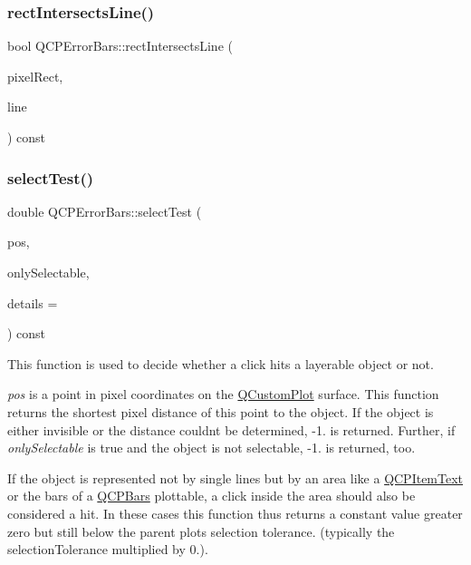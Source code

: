 \subsubsection{\texorpdfstring{rectIntersectsLine()}{rectIntersectsLine()}}
{\footnotesize\ttfamily bool Q\+C\+P\+Error\+Bars\+::rect\+Intersects\+Line (\begin{DoxyParamCaption}\item[{const Q\+RectF \&}]{pixel\+Rect,  }\item[{const Q\+LineF \&}]{line }\end{DoxyParamCaption}) const\hspace{0.3cm}{\ttfamily [protected]}}

\mbox{\label{class_q_c_p_error_bars_ac1b6675ef43e32547a3cbcf7b7ac46ed}} 
\subsubsection{\texorpdfstring{selectTest()}{selectTest()}}
{\footnotesize\ttfamily double Q\+C\+P\+Error\+Bars\+::select\+Test (\begin{DoxyParamCaption}\item[{const Q\+PointF \&}]{pos,  }\item[{bool}]{only\+Selectable,  }\item[{Q\+Variant $\ast$}]{details = {} }\end{DoxyParamCaption}) const\hspace{0.3cm}{\ttfamily [virtual]}}

This function is used to decide whether a click hits a layerable object or not.

{\itshape pos} is a point in pixel coordinates on the \mbox{\hyperlink{class_q_custom_plot}{Q\+Custom\+Plot}} surface. This function returns the shortest pixel distance of this point to the object. If the object is either invisible or the distance couldn\textquotesingle{}t be determined, -\/1. is returned. Further, if {\itshape only\+Selectable} is true and the object is not selectable, -\/1. is returned, too.

If the object is represented not by single lines but by an area like a \mbox{\hyperlink{class_q_c_p_item_text}{Q\+C\+P\+Item\+Text}} or the bars of a \mbox{\hyperlink{class_q_c_p_bars}{Q\+C\+P\+Bars}} plottable, a click inside the area should also be considered a hit. In these cases this function thus returns a constant value greater zero but still below the parent plot\textquotesingle{}s selection tolerance. (typically the selection\+Tolerance multiplied by 0.).

